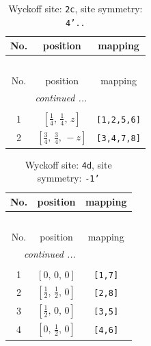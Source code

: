 \documentclass[fleqn,8pt]{jsarticle}
\begin{document}
\renewcommand{\arraystretch}{1.2}
\begin{longtable}{ccc}
\caption{Wyckoff site: {\tt 2c}, site symmetry: {\tt 4'..}}
 \\
 \hline \hline
No. & position & mapping \\ \hline \endfirsthead

\multicolumn{2}{l}{\tablename\ \thetable{}} \\
 \hline \hline
No. & position & mapping \\ \hline \endhead

 \hline \hline
\multicolumn{2}{r}{\footnotesize\it continued ...} \\ \endfoot

 \hline \hline
\multicolumn{2}{r}{} \\ \endlastfoot

1 & $\left[ \frac{1}{4},\, \frac{1}{4},\, z \right]$ & {\tt [1,2,5,6]} \\ \hline
2 & $\left[ \frac{3}{4},\, \frac{3}{4},\, - z \right]$ & {\tt [3,4,7,8]} \\
\end{longtable}
\renewcommand{\arraystretch}{1.2}
\begin{longtable}{ccc}
\caption{Wyckoff site: {\tt 4d}, site symmetry: {\tt -1'}}
 \\
 \hline \hline
No. & position & mapping \\ \hline \endfirsthead

\multicolumn{2}{l}{\tablename\ \thetable{}} \\
 \hline \hline
No. & position & mapping \\ \hline \endhead

 \hline \hline
\multicolumn{2}{r}{\footnotesize\it continued ...} \\ \endfoot

 \hline \hline
\multicolumn{2}{r}{} \\ \endlastfoot

1 & $\left[ 0,\, 0,\, 0 \right]$ & {\tt [1,7]} \\ \hline
2 & $\left[ \frac{1}{2},\, \frac{1}{2},\, 0 \right]$ & {\tt [2,8]} \\ \hline
3 & $\left[ \frac{1}{2},\, 0,\, 0 \right]$ & {\tt [3,5]} \\ \hline
4 & $\left[ 0,\, \frac{1}{2},\, 0 \right]$ & {\tt [4,6]} \\
\end{longtable}
\renewcommand{\arraystretch}{1.2}
\end{document}
